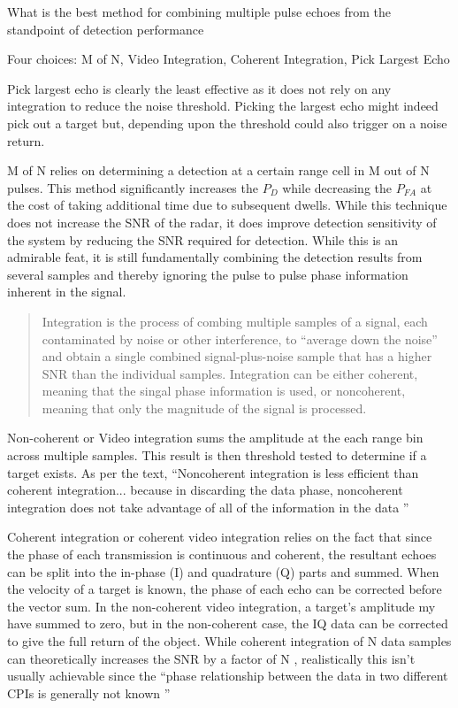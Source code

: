 \documentclass[12pt]{article}
\newenvironment{exercise}[2][Exercise]{\begin{trivlist}
    \item[\hskip \labelsep {\bfseries #1}\hskip \labelsep {\bfseries #2.}]}{\end{trivlist}}
\begin{document}
      \begin{exercise}{9}
      What is the best method for combining multiple pulse echoes from the standpoint of detection performance

      Four choices: M of N, Video Integration, Coherent Integration, Pick Largest Echo

      Pick largest echo is clearly the least effective as it does not rely on any integration to reduce the noise threshold. Picking the largest echo might indeed pick out a target but, depending upon the threshold could also trigger on a noise return.

      M of N \cite[p.~109]{POMR} relies on determining a detection at a certain range cell in M out of N pulses. This method significantly increases the $P_{D}$ while decreasing the $P_{FA}$ at the cost of taking additional time due to subsequent dwells. While this technique does not increase the SNR of the radar, it does improve detection sensitivity of the system by reducing the SNR required for detection. While this is an admirable feat, it is still fundamentally combining the detection results from several samples and thereby ignoring the pulse to pulse phase information inherent in the signal.

      \begin{quote}
      Integration is the process of combing multiple samples of a signal, each contaminated by noise or other interference, to ``average down the noise'' and obtain a single combined signal-plus-noise sample that has a higher SNR than the individual samples. Integration can be either coherent, meaning that the singal phase information is used, or noncoherent, meaning that only the magnitude of the signal is processed. \cite[p.~536]{POMR}
      \end{quote}
 
      Non-coherent or Video integration sums the amplitude at the each range bin across multiple samples. This result is then threshold tested to determine if a target exists. As per the text, ``Noncoherent integration is less efficient than coherent integration... because in discarding the data phase, noncoherent integration does not take advantage of all of the information in the data \cite[p.~538]{POMR}''  

      Coherent integration or coherent video integration relies on the fact that since the phase of each transmission is continuous and coherent, the resultant echoes can be split into the in-phase (I) and quadrature (Q) parts and summed. When the velocity of a target is known, the phase of each echo can be corrected before the vector sum. In the non-coherent video integration, a target's amplitude my have summed to zero, but in the non-coherent case, the IQ data can be corrected to give the full return of the object. While coherent integration of N data samples can theoretically increases the SNR by a factor of N \cite[p.~536]{POMR}, realistically this isn't usually achievable since the ``phase relationship between the data in two different CPIs is generally not known \cite[p.~550]{POMR}''


\end{exercise}
\end{document}
